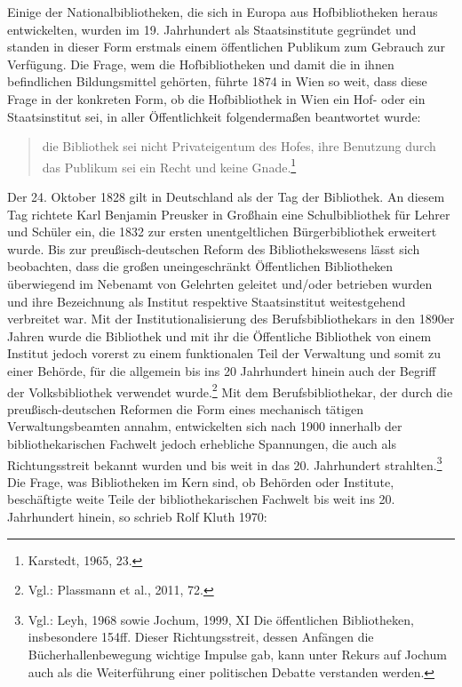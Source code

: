 \documentclass[a4paper,
fontsize=11pt,
oneside,
numbers=noperiodatend,
parskip=half-,
bibliography=totoc,
final
]{scrartcl}
\begin{document}
Einige der Nationalbibliotheken, die sich in Europa aus Hofbibliotheken
heraus entwickelten, wurden im 19. Jahrhundert als Staatsinstitute
gegründet und standen in dieser Form erstmals einem öffentlichen
Publikum zum Gebrauch zur Verfügung. Die Frage, wem die Hofbibliotheken
und damit die in ihnen befindlichen Bildungsmittel gehörten, führte 1874
in Wien so weit, dass diese Frage in der konkreten Form, ob die
Hofbibliothek in Wien ein Hof- oder ein Staatsinstitut sei, in aller
Öffentlichkeit folgendermaßen beantwortet wurde:

\begin{quote}
die Bibliothek sei nicht Privateigentum des Hofes, ihre Benutzung durch
das Publikum sei ein Recht und keine Gnade.\footnote{Karstedt, 1965, 23.}
\end{quote}

Der 24. Oktober 1828 gilt in Deutschland als der Tag der Bibliothek. An
diesem Tag richtete Karl Benjamin Preusker in Großhain eine
Schulbibliothek für Lehrer und Schüler ein, die 1832 zur ersten
unentgeltlichen Bürgerbibliothek erweitert wurde. Bis zur
preußisch-deutschen Reform des Bibliothekswesens lässt sich beobachten,
dass die großen uneingeschränkt Öffentlichen Bibliotheken überwiegend im
Nebenamt von Gelehrten geleitet und/oder betrieben wurden und ihre
Bezeichnung als Institut respektive Staatsinstitut weitestgehend
verbreitet war. Mit der Institutionalisierung des Berufsbibliothekars in
den 1890er Jahren wurde die Bibliothek und mit ihr die Öffentliche
Bibliothek von einem Institut jedoch vorerst zu einem funktionalen Teil
der Verwaltung und somit zu einer Behörde, für die allgemein bis ins 20
Jahrhundert hinein auch der Begriff der Volksbibliothek verwendet
wurde.\footnote{Vgl.: Plassmann et al., 2011, 72.} Mit dem
Berufsbibliothekar, der durch die preußisch-deutschen Reformen die Form
eines mechanisch tätigen Verwaltungsbeamten annahm, entwickelten sich
nach 1900 innerhalb der bibliothekarischen Fachwelt jedoch erhebliche
Spannungen, die auch als Richtungsstreit bekannt wurden und bis weit in
das 20. Jahrhundert strahlten.\footnote{Vgl.: Leyh, 1968 sowie Jochum,
  1999, XI Die öffentlichen Bibliotheken, insbesondere 154ff. Dieser
  Richtungsstreit, dessen Anfängen die Bücherhallenbewegung wichtige
  Impulse gab, kann unter Rekurs auf Jochum auch als die Weiterführung
  einer politischen Debatte verstanden werden.} Die Frage, was
Bibliotheken im Kern sind, ob Behörden oder Institute, beschäftigte
weite Teile der bibliothekarischen Fachwelt bis weit ins 20. Jahrhundert
hinein, so schrieb Rolf Kluth 1970:
\end{document}
